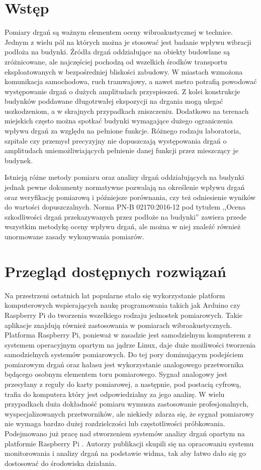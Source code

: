 \documentclass[a4paper,12pt]{mwart}
\begin{document}
\section{Wstęp}

Pomiary drgań są ważnym elementem oceny wibroakustycznej w technice. Jednym
z wielu pól na których można je stosować jest badanie wpływu wibracji
podłoża na budynki. Źródła drgań oddziałujące na obiekty budowlane są
zróżnicowane, ale najczęściej pochodzą od wszelkich środków transportu
eksploatowanych w bezpośredniej bliskości zabudowy. W miastach wzmożona
komunikacja samochodowa, ruch tramwajowy, a nawet metro potrafią powodować
występowanie drgań o dużych amplitudach przyspieszeń. Z kolei konstrukcje
budynków poddawane długotrwałej ekspozycji na drgania mogą ulegać
uszkodzeniom, a w skrajnych przypadkach zniszczeniu. Dodatkowo na terenach
miejskich często można spotkać budynki wymagające dużego ograniczenia wpływu
drgań za względu na pełnione funkcje. Różnego rodzaju laboratoria, szpitale
czy przemysł precyzyjny nie dopuszczają występowania drgań o amplitudach
uniemożliwiających pełnienie danej funkcji przez mieszczący je budynek.

Istnieją różne metody pomiaru oraz analizy drgań oddziałujących na budynki
jednak pewne dokumenty normatywne pozwalają na określenie wpływu drgań oraz
weryfikację pomiarową i późniejsze porównania, czy też odniesienie wyników
do wartości dopuszczalnych. Norma PN-B 02170:2016-12 pod tytułem ,,Ocena
szkodliwości drgań przekazywanych przez podłoże na budynki'' \cite{norma}
zawiera przede wszystkim metodykę oceny wpływu drgań, ale można w niej
znaleźć również unormowane zasady wykonywania pomiarów.

\section{Przegląd dostępnych rozwiązań}

Na przestrzeni ostatnich lat popularne stało się wykorzystanie platform
komputerowych wspierających naukę programowania takich jak Arduino czy Raspberry
Pi do tworzenia wszelkiego rodzaju jednostek pomiarowych. Takie aplikacje
znajdują również zastosowania w pomiarach wibroakustycznych. Platforma Raspberry
Pi, ponieważ w zasadzie jest samodzielnym komputerem z systemem operacyjnym
opartym na jądrze Linux, daje duże możliwości tworzenia samodzielnych systemów
pomiarowych. Do tej pory dominującym podejściem pomiarowym drgań oraz hałasu
jest wykorzystanie analogowego przetwornika będącego osobnym elementem toru
pomiarowego. Sygnał analogowy jest przesyłany z reguły do karty pomiarowej, a
następnie, pod postacią cyfrową, trafia do komputera który jest odpowiedzialny
za jego analizę. W wielu przypadkach duża dokładność pomiaru wymusza
zastosowanie profesjonalnych, wyspecjalizowanych przetworników, ale niekiedy
zdarza się, że sygnał pomiarowy nie wymaga bardzo dużej rozdzielczości lub
częstotliwości próbkowania. Podejmowano już pracę nad stworzeniem systemów
analizy drgań opartym na platformie Raspberry Pi \cite{art1}. Autorzy publikacji
skupili się na opracowaniu systemu monitorowania i analizy drgań na podstawie
widma, tak aby łatwo dało się go dostosować do środowiska działania. 
\end{document}
